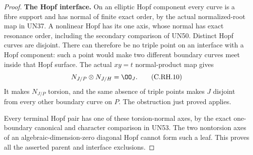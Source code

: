 \begin{proof}
\par\medskip\noindent\textbf{The Hopf interface.}
On an elliptic Hopf
component every curve
is a fibre support and
has normal of finite
exact order, by the
actual normalized-root
map in UN37. A nonlinear
Hopf has its one axis,
whose normal has exact
resonance order, including
the secondary comparison
of UN50. Distinct Hopf
curves are disjoint.
There can therefore be
no triple point on an
interface with a Hopf
component: such a point
would make two different
boundary curves meet
inside that Hopf surface.
The actual \(xy=t\)
normal-product map gives
\[
                     N_{J/P}\otimes N_{J/H}=\OO_J.
 \tag{C.RH.10}
\]
It makes \(N_{J/P}\)
torsion, and the same
absence of triple points
makes \(J\) disjoint
from every other
boundary curve on \(P\).
The obstruction just
proved applies.

Every terminal Hopf
pair has one of these
torsion-normal axes,
by the exact
one-boundary canonical
and character comparison
in UN53. The two
nontorsion axes of
an algebraic-dimension-zero
diagonal Hopf cannot
form such a leaf.
This proves all the
asserted parent and
interface exclusions.
\end{proof}
